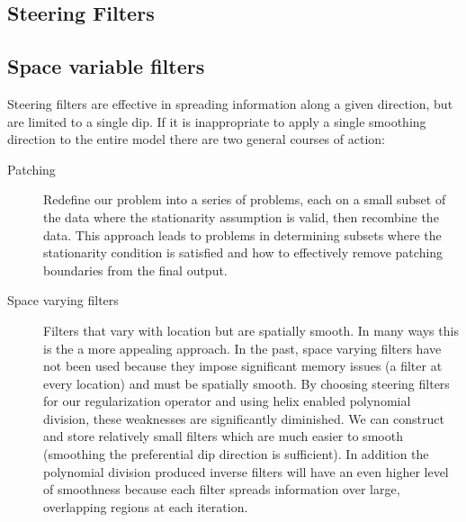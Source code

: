 \subsection{Steering Filters}
 

\subsection{Space variable filters}
Steering filters are effective in spreading information
along a given direction, but are limited to a single dip.
If it is inappropriate to apply a single smoothing direction to
the entire
model 
there are two general
courses of action:
\begin{description}
\item [Patching] \cite{Claerbout.sep.73.391,Schwab.sep.84.271}
Redefine our problem into a series of problems,
each on a small subset of the data where the stationarity assumption is
valid, then recombine the data.  This approach leads to problems in determining
                 subsets where the stationarity condition is satisfied
    and how to effectively remove patching boundaries from the final output.
\item [Space varying filters] Filters that vary with location
but are spatially smooth. In many ways this is the a more appealing
approach.
In the past, space varying filters have not been used because they
impose significant memory issues (a filter at every location) and must
be spatially smooth.
By choosing steering filters for our regularization operator and using
helix enabled polynomial division, these 
weaknesses are significantly diminished.  
We can construct and store relatively
small filters which are much easier to smooth  (smoothing the preferential
dip direction is sufficient).
In addition the polynomial division produced inverse
filters will have an even higher level of smoothness because 
each filter spreads
information over large, overlapping regions at each iteration.
\end{description}


